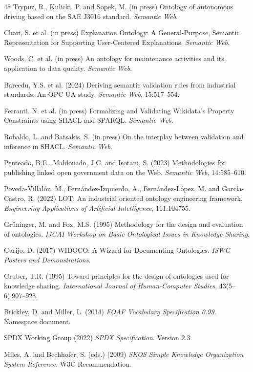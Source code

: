 \documentclass[Afour,sagev,times]{sagej}
\begin{document}
\begin{thebibliography}{48}
 Trypuz, R., Kulicki, P. and Sopek, M. (in press) Ontology of autonomous driving based on the SAE J3016 standard. \emph{Semantic Web}.

 Chari, S. et al. (in press) Explanation Ontology: A General-Purpose, Semantic Representation for Supporting User-Centered Explanations. \emph{Semantic Web}.

 Woods, C. et al. (in press) An ontology for maintenance activities and its application to data quality. \emph{Semantic Web}.

 Bareedu, Y.S. et al. (2024) Deriving semantic validation rules from industrial standards: An OPC UA study. \emph{Semantic Web}, 15:517--554.

 Ferranti, N. et al. (in press) Formalizing and Validating Wikidata's Property Constraints using SHACL and SPARQL. \emph{Semantic Web}.

 Robaldo, L. and Batsakis, S. (in press) On the interplay between validation and inference in SHACL. \emph{Semantic Web}.

 Penteado, B.E., Maldonado, J.C. and Isotani, S. (2023) Methodologies for publishing linked open government data on the Web. \emph{Semantic Web}, 14:585--610.

 Poveda-Villalón, M., Fernández-Izquierdo, A., Fernández-López, M. and García-Castro, R. (2022) LOT: An industrial oriented ontology engineering framework. \emph{Engineering Applications of Artificial Intelligence}, 111:104755.

 Gr\"uninger, M. and Fox, M.S. (1995) Methodology for the design and evaluation of ontologies. \emph{IJCAI Workshop on Basic Ontological Issues in Knowledge Sharing}.

 Garijo, D. (2017) WIDOCO: A Wizard for Documenting Ontologies. \emph{ISWC Posters and Demonstrations}.

 Gruber, T.R. (1995) Toward principles for the design of ontologies used for knowledge sharing. \emph{International Journal of Human-Computer Studies}, 43(5--6):907--928.

 Brickley, D. and Miller, L. (2014) \emph{FOAF Vocabulary Specification 0.99}. Namespace document.

 SPDX Working Group (2022) \emph{SPDX Specification}. Version 2.3.

 Miles, A. and Bechhofer, S. (eds.) (2009) \emph{SKOS Simple Knowledge Organization System Reference}. W3C Recommendation.


\end{thebibliography}
\end{document}
